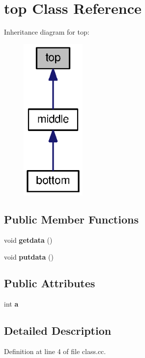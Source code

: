 \section{top Class Reference}
\label{classtop}


Inheritance diagram for top\-:\nopagebreak
\begin{figure}[H]
\begin{center}
\leavevmode
\includegraphics[width=90pt]{classtop__inherit__graph}
\end{center}
\end{figure}
\subsection*{Public Member Functions}
\begin{DoxyCompactItemize}
\item 
void {\bf getdata} ()
\item 
void {\bf putdata} ()
\end{DoxyCompactItemize}
\subsection*{Public Attributes}
\begin{DoxyCompactItemize}
\item 
int {\bf a}
\end{DoxyCompactItemize}


\subsection{Detailed Description}


Definition at line 4 of file class.\-cc.




